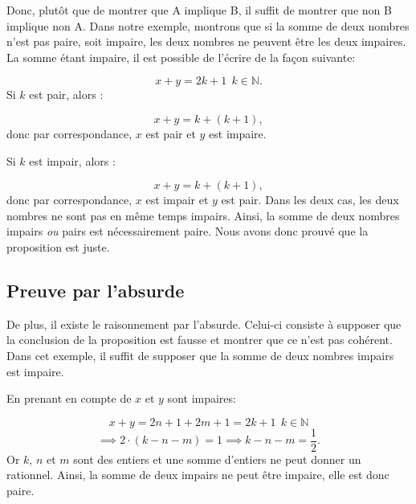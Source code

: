 \documentclass[oneside,12pt,french,table]{book}
\theoremstyle{definition}
\theoremstyle{plain}
\theoremstyle{remark}
\begin{document}
Donc, plutôt que de montrer que A implique B, il suffit de montrer que non B implique non A. Dans notre exemple, montrons que si la somme de deux nombres n'est pas paire, soit impaire, les deux nombres ne peuvent être les deux impaires. \\

La somme étant impaire, il est possible de l'écrire de la façon suivante:

\begin{equation}
    x+y=2k+1~~ k\in \mathbb{N}.
\end{equation}
Si $k$ est pair, alors :

\begin{equation}
    x+y=k+(k+1),
\end{equation}
donc par correspondance, $x$ est pair et $y$ est impaire. 

Si $k$ est impair, alors :

\begin{equation}
    x+y=k+(k+1),
\end{equation}
donc par correspondance, $x$ est impair et $y$ est pair. Dans les deux cas, les deux nombres ne sont pas en même temps impairs. Ainsi, la somme de deux nombres impairs \textit{ou} pairs est nécessairement paire. Nous avons donc prouvé que la proposition est juste.

\subsection{Preuve par l'absurde}
De plus, il existe le raisonnement par l'absurde. Celui-ci consiste à supposer que la conclusion de la proposition est fausse et montrer que ce n'est pas cohérent. Dans cet exemple, il suffit de supposer que la somme de deux nombres impairs est impaire. 

En prenant en compte de $x$ et $y$ sont impaires:

\begin{equation}
    x+y=2n+1+2m+1=2k+1~~ k\in \mathbb{N}
\end{equation}
\begin{equation}
    \implies 2\cdot (k-n-m)=1\implies k-n-m=\dfrac{1}{2}.  
\end{equation}
Or $k$, $n$ et $m$ sont des entiers et une somme d'entiers ne peut donner un rationnel. Ainsi, la somme de deux impairs ne peut être impaire, elle est donc paire.\\
\end{document}

